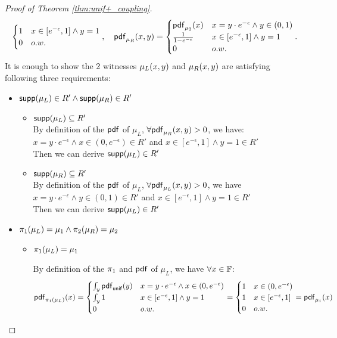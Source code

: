 \documentclass[a4paper,11pt]{article}
\begin{document}
\begin{proof}[Proof of Theorem \ref{thm:unif+_coupling}]
\[\begin{cases}
	1 		& x \in [e^{-\epsilon}, 1] \land y = 1\\
	0       & o.w.
	\end{cases},
~~~
	\mathsf{pdf}_{\mu_R}(x, y) = 
	\begin{cases}
	\mathsf{pdf}_{\mu_2}(x) 		& x = y \cdot e^{-\epsilon} \land y \in (0, 1)\\
	\frac{1}{1 - e^{-\epsilon}}& x \in [e^{-\epsilon}, 1] \land y = 1\\
	0       & o.w.
	\end{cases}.
\]
It is enough to show the 2 witnesses $\mu_L(x, y)$ and $\mu_R(x, y)$ are satisfying following three requirements:
\begin{itemize}
	\item $\mathsf{supp}(\mu_L) \in R' \land \mathsf{supp}(\mu_R) \in R'$

	\begin{itemize}
		\item $\mathsf{supp}(\mu_L) \subseteq R'$ 
		\\
		By definition of the $\mathsf{pdf}$ of $\mu_L$, 
		$\forall \mathsf{pdf}_{\mu_R}(x, y) > 0$,
		we have: 
		\\
		$x = y \cdot e^{-\epsilon} \land x \in (0, e^{-\epsilon})\in R'$ 
		and 
		$x \in [e^{-\epsilon}, 1] \land y = 1 \in R'$
		\\%
		Then we can derive $\mathsf{supp}(\mu_L) \in R'$
		\item $\mathsf{supp}(\mu_R) \subseteq R'$
		\\
		By definition of the $\mathsf{pdf}$ of $\mu_L$, 
		$\forall \mathsf{pdf}_{\mu_L}(x, y) > 0$,
		we have
		\\
		$x = y \cdot e^{-\epsilon} \land y \in (0, 1)\in R'$ 
		and 
		$x \in [e^{-\epsilon}, 1] \land y = 1 \in R'$
		\\
		Then we can derive $\mathsf{supp}(\mu_L) \in R'$
	\end{itemize}		
%
	\item $\pi_1(\mu_L) = \mu_1 \land \pi_2(\mu_R) = \mu_2$
	
	\begin{itemize}
		\item $\pi_1(\mu_L) = \mu_1$ 


		By definition of the $\pi_1$ and $\mathsf{pdf}$ of $\mu_L$, we have $\forall x  \in \mathbb{F}$:
		\[
			\mathsf{pdf}_{\pi_1(\mu_L)}(x) = 
			\begin{cases}
			\int_{y}\mathsf{pdf}_{\mathsf{unif}}(y) 
			& x = y \cdot e^{-\epsilon}  \land x \in (0, e^{-\epsilon})\\
			\int_{y} 1 & x \in [e^{-\epsilon}, 1] \land y = 1\\
			0       & o.w.
			\end{cases} 
			= 
			\begin{cases}
			1
			&  x \in (0, e^{-\epsilon})\\
			1 & x \in [e^{-\epsilon}, 1] \\
			0       & o.w.
			\end{cases}
			=
			\mathsf{pdf}_{\mu_1}(x)
		\]


\end{itemize}
\end{itemize}
\end{proof}
\end{document}
